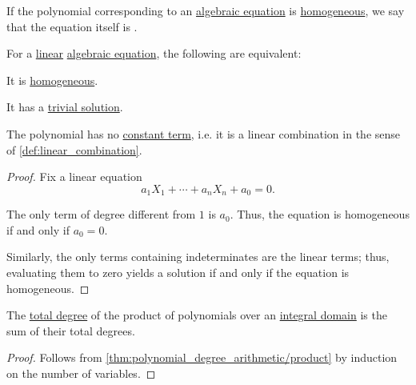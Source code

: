 \begin{definition}\label{def:homogeneous_equation}\mimprovised
  If the polynomial corresponding to an \hyperref[def:algebraic_equation]{algebraic equation} is \hyperref[def:homogeneous_polynomial]{homogeneous}, we say that the equation itself is .
\end{definition}

\begin{proposition}\label{thm:homogeneous_linear_equation}
  For a \hyperref[def:polynomial_degree_terminology]{linear} \hyperref[def:algebraic_equation]{algebraic equation}, the following are equivalent:
  \begin{thmenum}
     It is \hyperref[def:homogeneous_equation]{homogeneous}.

     It has a \hyperref[def:trivial_solution_of_algebraic_equation]{trivial solution}.

     The polynomial has no \hyperref[def:univariate_polynomial]{constant term}, i.e. it is a linear combination in the sense of \cref{def:linear_combination}.
  \end{thmenum}
\end{proposition}
\begin{proof}
  Fix a linear equation
  \begin{equation*}
    a_1 X_1 + \cdots + a_n X_n + a_0 = 0.
  \end{equation*}

  The only term of degree different from \( 1 \) is \( a_0 \). Thus, the equation is homogeneous if and only if \( a_0 = 0 \).

  Similarly, the only terms containing indeterminates are the linear terms; thus, evaluating them to zero yields a solution if and only if the equation is homogeneous.
\end{proof}

\begin{proposition}\label{thm:degree_of_multivariate_polynomial_product}
  The \hyperref[def:polynomial_degree]{total degree} of the product of polynomials over an \hyperref[def:integral_domain]{integral domain} is the sum of their total degrees.
\end{proposition}
\begin{proof}
  Follows from \cref{thm:polynomial_degree_arithmetic/product} by induction on the number of variables.
\end{proof}

